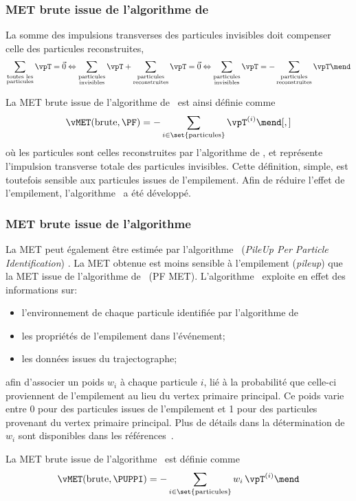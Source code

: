 \subsubsection{MET brute issue de l'algorithme de \PF}
La somme des impulsions transverses des particules invisibles doit compenser celle des particules reconstruites, \ie
\begin{equation}
\sum_{\substack{\text{toutes les}\\\text{particules}}} \vpT = \vec{0}
\Leftrightarrow
\sum_{\substack{\text{particules}\\\text{invisibles}}} \vpT + \sum_{\substack{\text{particules}\\\text{reconstruites}}} \vpT = \vec{0}
\Leftrightarrow
\sum_{\substack{\text{particules}\\\text{invisibles}}} \vpT = -\sum_{\substack{\text{particules}\\\text{reconstruites}}} \vpT \mend
\end{equation}
\par La MET brute issue de l'algorithme de \PF\ est ainsi définie comme
\begin{equation}
\vMET(\text{brute}, \text{\PF}) = -\sum_{i\in\set{\text{particules}}} \vpT^{(i)}
\mend[,]
\end{equation}
où les particules sont celles reconstruites par l'algorithme de \PF,
et représente l'impulsion transverse totale des particules invisibles.
Cette définition, simple, est toutefois sensible aux particules issues de l'empilement.
Afin de réduire l'effet de l'empilement, l'algorithme \PUPPI\ a été développé.
\subsubsection{MET brute issue de l'algorithme \PUPPI}
La MET peut également être estimée par l'algorithme \PUPPI\ (\emph{PileUp Per Particle Identification}) \cite{PUPPI}.
La \og \PUPPI MET \fg{} obtenue est moins sensible à l'empilement (\emph{pileup}) que la MET issue de l'algorithme de \PF\ (PF MET).
L'algorithme \PUPPI\ exploite en effet des informations sur:
\begin{itemize}
\item l'environnement de chaque particule identifiée par l'algorithme de \PF\;
\item les propriétés de l'empilement dans l'événement;
\item les données issues du trajectographe;
\end{itemize}
afin d'associer un poids $w_i$ à chaque particule $i$, lié à la probabilité que celle-ci proviennent de l'empilement au lieu du vertex primaire principal.
Ce poids varie entre
\num{0} pour des particules issues de l'empilement
et
\num{1} pour des particules provenant du vertex primaire principal.
Plus de détails dans la détermination de $w_i$ sont disponibles dans les références~\cite{CMS-PAS-JME-17-001,PUPPI}.
\par La MET brute issue de l'algorithme \PUPPI\ est définie comme
\begin{equation}
\vMET(\text{brute}, \text{\PUPPI}) = -\sum_{i\in\set{\text{particules}}} w_i\,\vpT^{(i)}
\mend
\end{equation}
